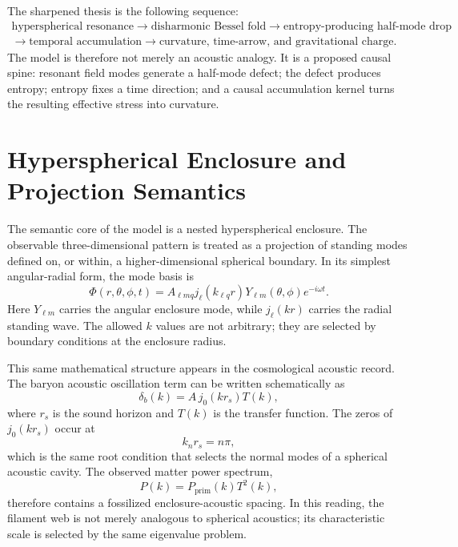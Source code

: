 \documentclass[11pt,a4paper]{article}
\renewcommand{\boxed}[1]{#1}
\begin{document}
The sharpened thesis is the following sequence:
\begin{equation}
\boxed{
\begin{gathered}
\text{hyperspherical resonance}
\rightarrow
\text{disharmonic Bessel fold}
\rightarrow
\text{entropy-producing half-mode drop}
\\
\rightarrow
\text{temporal accumulation}
\rightarrow
\text{curvature, time-arrow, and gravitational charge}.
\end{gathered}}
\label{eq:thesis-chain}
\end{equation}
The model is therefore not merely an acoustic analogy. It is a proposed causal spine: resonant field modes generate a half-mode defect; the defect produces entropy; entropy fixes a time direction; and a causal accumulation kernel turns the resulting effective stress into curvature.

\section{Hyperspherical Enclosure and Projection Semantics}

The semantic core of the model is a nested hyperspherical enclosure. The observable three-dimensional pattern is treated as a projection of standing modes defined on, or within, a higher-dimensional spherical boundary. In its simplest angular-radial form, the mode basis is
\begin{equation}
\Phi(r,\theta,\phi,t)=A_{\ell m q}j_\ell(k_{\ell q}r)Y_{\ell m}(\theta,\phi)e^{-i\omega t}.
\label{eq:spherical-mode-basis}
\end{equation}
Here $Y_{\ell m}$ carries the angular enclosure mode, while $j_\ell(k r)$ carries the radial standing wave. The allowed $k$ values are not arbitrary; they are selected by boundary conditions at the enclosure radius.

This same mathematical structure appears in the cosmological acoustic record. The baryon acoustic oscillation term can be written schematically as
\begin{equation}
\delta_b(k)=A\,j_0(k r_s)T(k),
\label{eq:bao-bessel}
\end{equation}
where $r_s$ is the sound horizon and $T(k)$ is the transfer function. The zeros of $j_0(k r_s)$ occur at
\begin{equation}
k_n r_s=n\pi,
\label{eq:bao-nodes}
\end{equation}
which is the same root condition that selects the normal modes of a spherical acoustic cavity. The observed matter power spectrum,
\begin{equation}
P(k)=P_{\mathrm{prim}}(k)T^2(k),
\label{eq:power-spectrum}
\end{equation}
therefore contains a fossilized enclosure-acoustic spacing. In this reading, the filament web is not merely analogous to spherical acoustics; its characteristic scale is selected by the same eigenvalue problem.
\end{document}

